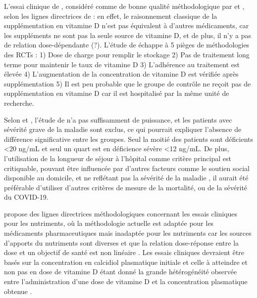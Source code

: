 \documentclass[
  a4paper,
  DIV=11,
  numbers=noendperiod,
  listof=totoc]{scrreprt}
\begin{document}
L'essai clinique de \textcite{Murai.2021}, considéré comme de bonne
qualité méthodologique par \textcite{Annweiler.2021} et
\textcite{Argano.2023}, selon les lignes directrices de
\textcite{Heaney.2014} : en effet, le raisonnement classique de la
supplémentation en vitamine D n'est pas équivalent à d'autres
médicaments, car les suppléments ne sont pas la seule source de vitamine
D, et de plus, il n'y a pas de relation dose-dépendante (?). L'étude de
\textcite{Murai.2021} échappe à 5 pièges de méthodologies des \acp{RCT}
: 1) Dose de charge pour remplir le stockage 2) Pas de traitement long
terme pour maintenir le taux de vitamine D 3) L'adhérence au traitement
est élevée 4) L'augmentation de la concentration de vitamine D est
vérifiée après supplémentation 5) Il est peu probable que le groupe de
contrôle ne reçoit pas de supplémentation en vitamine D car il est
hospitalisé par la même unité de recherche.

Selon \textcite{Leaf.2021} et \textcite{Annweiler.2021}, l'étude de
\textcite{Murai.2021} n'a pas suffisamment de puissance, et les patients
avec sévérité grave de la maladie sont exclus, ce qui pourrait expliquer
l'absence de différence significative entre les groupes. Seul la moitié
des patients sont déficients \textless20 ng/mL et seul un quart est en
déficience sévère \textless12 ng/mL. De plus, l'utilisation de la
longueur de séjour à l'hôpital comme critère principal est critiquable,
pouvant être influencée par d'autres facteurs comme le soutien social
disponible au domicile, et ne reflétant pas la sévérité de la maladie
\autocite{Annweiler.2021}, il aurait été préférable d'utiliser d'autres
critères de mesure de la mortalité, ou de la sévérité du COVID-19.

\textcite{Heaney.2014} propose des lignes directrices méthodologiques
concernant les essais cliniques pour les nutriments, où la méthodologie
actuelle est adaptée pour les médicaments pharmaceutiques mais inadaptée
pour les nutriments car les sources d'apports du nutriments sont
diverses et que la relation dose-réponse entre la dose et un objectif de
santé est non linéaire \autocite{Grant.2022.nutrients}. Les essais
cliniques devraient être basés sur la concentration en calcidiol
plasmatique initiale et celle à atteindre et non pas en dose de vitamine
D étant donné la grande hétérogénéité observée entre l'administration
d'une dose de vitamine D et la concentration plasmatique obtenue
\autocite{Grant.2022.nutrients}.
\end{document}
